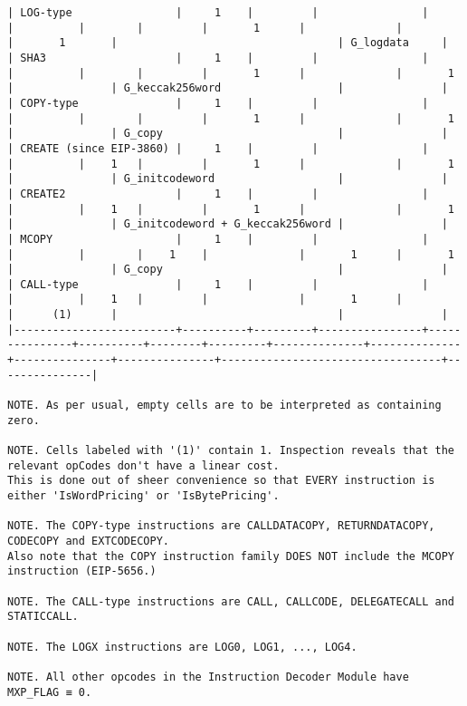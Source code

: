 \documentclass[varwidth=\maxdimen,margin=0.5cm,multi={verbatim}]{standalone}
\begin{document}
\begin{verbatim}
| LOG-type                |     1    |         |                |               |          |        |         |       1      |              |               |       1       |                                  | G_logdata     |
| SHA3                    |     1    |         |                |               |          |        |         |       1      |              |       1       |               | G_keccak256word                  |               |
| COPY-type               |     1    |         |                |               |          |        |         |       1      |              |       1       |               | G_copy                           |               |
| CREATE (since EIP-3860) |     1    |         |                |               |          |    1   |         |       1      |              |       1       |               | G_initcodeword                   |               |
| CREATE2                 |     1    |         |                |               |          |    1   |         |       1      |              |       1       |               | G_initcodeword + G_keccak256word |               |
| MCOPY                   |     1    |         |                |               |          |        |    1    |              |       1      |       1       |               | G_copy                           |               |
| CALL-type               |     1    |         |                |               |          |    1   |         |              |       1      |               |      (1)      |                                  |               |
|-------------------------+----------+---------+----------------+---------------+----------+--------+---------+--------------+--------------+---------------+---------------+----------------------------------+---------------|

NOTE. As per usual, empty cells are to be interpreted as containing zero.

NOTE. Cells labeled with '(1)' contain 1. Inspection reveals that the relevant opCodes don't have a linear cost.
This is done out of sheer convenience so that EVERY instruction is either 'IsWordPricing' or 'IsBytePricing'.

NOTE. The COPY-type instructions are CALLDATACOPY, RETURNDATACOPY, CODECOPY and EXTCODECOPY.
Also note that the COPY instruction family DOES NOT include the MCOPY instruction (EIP-5656.)

NOTE. The CALL-type instructions are CALL, CALLCODE, DELEGATECALL and STATICCALL.

NOTE. The LOGX instructions are LOG0, LOG1, ..., LOG4.

NOTE. All other opcodes in the Instruction Decoder Module have MXP_FLAG ≡ 0.

\end{verbatim}
\end{document}
